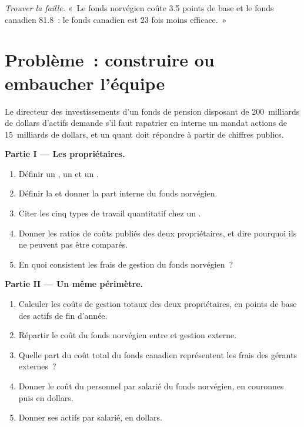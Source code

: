 \begin{exercise}[$\star\star\star$]\label{exo:in:asset-managers-pensions-sovereign-funds-and-insurers:8}
\emph{Trouver la faille.} «~Le fonds norvégien coûte 3.5 points de base et le fonds canadien 81.8~: le fonds canadien est 23 fois
moins efficace.~»
\end{exercise}

\section{Problème~: construire ou embaucher l'équipe}

\begin{problem}\label{pb:in:asset-managers-pensions-sovereign-funds-and-insurers:1}
Le directeur des investissements d'un fonds de pension disposant de 200~milliards de dollars d'actifs demande
s'il faut rapatrier en interne un mandat actions de 15~milliards de dollars, et un quant doit répondre à partir de chiffres publics.

\medskip\noindent\textbf{Partie I --- Les propriétaires.}
\begin{enumerate}
\item Définir un , un  et un .
\item Définir la  et donner la part interne du fonds norvégien.
\item Citer les cinq types de travail quantitatif chez un .
\item Donner les ratios de coûts publiés des deux propriétaires, et dire pourquoi ils ne peuvent pas être comparés.
\item En quoi consistent les frais de gestion du fonds norvégien~?
\end{enumerate}

\medskip\noindent\textbf{Partie II --- Un même périmètre.}
\begin{enumerate}[resume]
\item Calculer les coûts de gestion totaux des deux propriétaires, en points de base des actifs de fin d'année.
\item Répartir le coût du fonds norvégien entre  et gestion externe.
\item Quelle part du coût total du fonds canadien représentent les frais des gérants externes~?
\item Donner le coût du personnel par salarié du fonds norvégien, en couronnes puis en dollars.
\item Donner ses actifs par salarié, en dollars.
\end{enumerate}


\end{problem}
